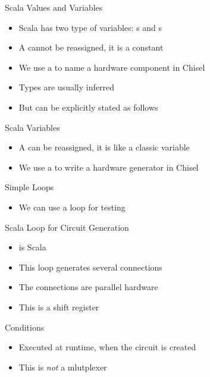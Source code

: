 \begin{frame}[fragile]{Scala Values and Variables}
\begin{itemize}
\item Scala has two type of variables: s and s
\item A  cannot be reassigned, it is a constant
\item We use a  to name a hardware component in Chisel
\end{itemize}
\begin{itemize}
\item Types are usually inferred
\item But can be explicitly stated as follows
\end{itemize}
\end{frame}

\begin{frame}[fragile]{Scala Variables}
\begin{itemize}
\item A  can be reassigned, it is like a classic variable
\item We use a  to write a hardware generator in Chisel
\end{itemize}
\end{frame}

\begin{frame}[fragile]{Simple Loops}
\begin{itemize}
\item We can use a loop for testing
\end{itemize}
\end{frame}

\begin{frame}[fragile]{Scala  Loop for Circuit Generation}
\begin{itemize}
\item {} is Scala
\item This loop generates several connections
\item The connections are parallel hardware
\item This is a shift register
\end{itemize}
\end{frame}

\begin{frame}[fragile]{Conditions}
\begin{itemize}
\item Executed at runtime, when the circuit is created
\item This is \emph{not} a mlutplexer
\end{itemize}
\end{frame}


